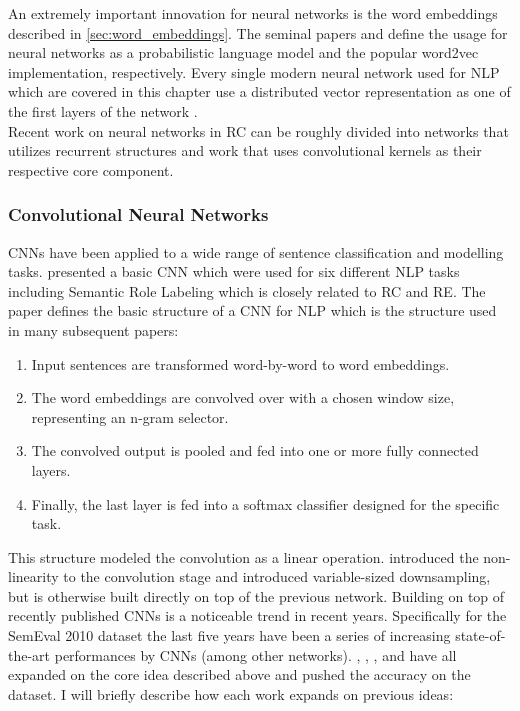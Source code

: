 An extremely important innovation for neural networks is the word embeddings described in \autoref{sec:word_embeddings}. The seminal papers \citep{bengio2003} and \citep{mikolov2013} define the usage for neural networks as a probabilistic language model and the popular word2vec implementation, respectively. Every single modern neural network used for NLP which are covered in this chapter use a distributed vector representation as one of the first layers of the network \citep{att_cnn} \citep{cnn_rank} \citep{re_lstm} \citep{re_cnn}. \\ %

Recent work on neural networks in RC can be roughly divided into networks that utilizes recurrent structures and work that uses convolutional kernels as their respective core component. 

\subsubsection{Convolutional Neural Networks}

CNNs have been applied to a wide range of sentence classification and modelling tasks. \citep{collobert2008} presented a basic CNN which were used for six different NLP tasks including Semantic Role Labeling which is closely related to RC and RE. The paper defines the basic structure of a CNN for NLP which is the structure used in many subsequent papers:

\begin{enumerate}
\item Input sentences are transformed word-by-word to word embeddings.
\item The word embeddings are convolved over with a chosen window size, representing an n-gram selector.
\item The convolved output is pooled and fed into one or more fully connected layers.
\item Finally, the last layer is fed into a softmax classifier designed for the specific task.

\end{enumerate}

This structure modeled the convolution as a linear operation. \citep{kalchbrenner2014} introduced the non-linearity to the convolution stage and introduced variable-sized downsampling, but is otherwise built directly on top of the previous network. 
Building on top of recently published CNNs is a noticeable trend in recent years. Specifically for the SemEval 2010 dataset the last five years have been a series of increasing state-of-the-art performances by CNNs (among other networks). \citep{zeng2014}, \citep{re_cnn}, \citep{cnn_rank}, \citep{xu2015} and \citep{att_cnn} have all expanded on the core idea described above and pushed the accuracy on the dataset. I will briefly describe how each work expands on previous ideas:

